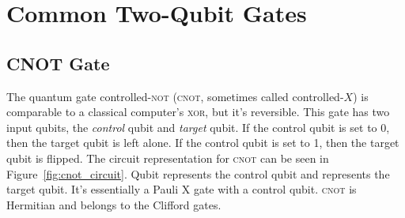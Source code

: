\documentclass[11pt, notitlepage]{report}
\begin{document}
\section{Common Two-Qubit Gates}
\subsection{CNOT Gate}
The quantum gate controlled-\textsc{not} (\textsc{cnot}, sometimes called controlled-$X$) is comparable to a classical computer's \textsc{xor}, but it's reversible. This gate has two input qubits, the \emph{control} qubit and \emph{target} qubit. If the control qubit is set to 0, then the target qubit is left alone. If the control qubit is set to 1, then the target qubit is flipped. The circuit representation for \textsc{cnot} can be seen in Figure~\ref{fig:cnot_circuit}. Qubit  represents the control qubit and  represents the target qubit. It's essentially a Pauli X gate with a control qubit. \textsc{cnot} is Hermitian and belongs to the Clifford gates.
\end{document}
